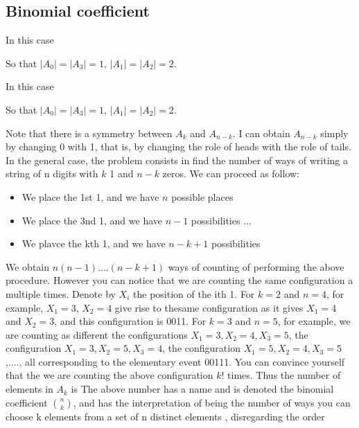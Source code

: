 	\subsection{Binomial coefficient}
\begin{example}

	In this case 

			So that $|A_0|=|A_3| = 1 $, $|A_1 |= |A_2| =2$.
\end{example} 



\begin{example}

	In this case 

			So that $|A_0|=|A_3| = 1 $, $|A_1 |= |A_2| =2$.
\end{example} 
Note that there is a symmetry between $A_k$ and $A_{n-k}$. I can obtain $A_{n-k}$ simply by changing 0 with 1, that is, by changing the role of heads with the role of tails. In the general case, the problem consists in find the number of ways of writing a string of n digits with $k$ 1 and $n-k$ zeros. We can proceed as follow: 
\begin{itemize}
	\item We place the 1st 1, and we have $n$ possible places 
	\item We place the 3nd 1, and we have $n-1$ possibilities 
		... 
	\item We plavce the kth 1, and we have $n-k+1$ possibilities
\end{itemize}


We obtain $n(n-1)....(n-k+1)$ ways of counting of performing the above procedure. However you can notice that we are counting the same configuration a multiple times. Denote by $X_i$ the position of the ith 1. For $k=2$ and $n=4$, for example, $X_1 = 3$, $X_2 = 4$ give rise to thesame configuration as it gives $X_1 = 4 $ and $X_2 =3$, and this configuration is 0011.  For $k= 3$ and $n=5$, for example, we are counting as different the configurations $X_1 = 3, X_2=4, X_3=5$,  the configuration $X_1 =3 ,X_2= 5 , X_3 =4$, the configuration $X_1 = 5, X_2 = 4, X_3 =5 $,...., all corresponding to the elementary event  00111. You can convince yourself that the we are counting the above configuration $k!$ times. Thus the number of elements in $A_k$ is 
The above number has a name and is denoted the binomial coefficient $n\choose{k}$, and has the interpretation of being the number of ways you can choose k elements from a set of n distinct elements , disregarding the order 

